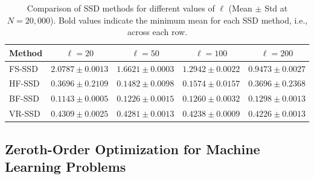 \documentclass[10pt]{article} %
\numberwithin{equation}{section}
\theoremstyle{plain}
\theoremstyle{definition}
\newcommand{\<}{\langle}
\renewcommand{\>}{\rangle}
\renewcommand{\(}{\left(}
\renewcommand{\)}{\right)}
\renewcommand{\[}{\left[}
\renewcommand{\]}{\right]}
\begin{document}

\begin{table}[ht!]
\centering
\caption{Comparison of SSD methods for different values of $\ell$ (Mean $\pm$ Std at $N=20,000$). Bold values indicate the minimum mean for each SSD method, i.e., across each row.}
\label{tab:worst-ell-performance}
\begin{tabular}{@{}lcccc@{}}
\toprule
Method & $\ell=20$ & $\ell=50$ & $\ell=100$ & $\ell=200$ \\ \midrule
FS-SSD & $2.0787 \pm 0.0013$ & $1.6621 \pm 0.0003$ & $1.2942 \pm 0.0022$ & $\mathbf{0.9473 \pm 0.0027}$ \\
HF-SSD & $0.3696 \pm 0.2109$ & $\mathbf{0.1482 \pm 0.0098}$ & $0.1574 \pm 0.0157$ & $0.3696 \pm 0.2368$ \\
BF-SSD & $\mathbf{0.1143 \pm 0.0005}$ & $0.1226 \pm 0.0015$ & $0.1260 \pm 0.0032$ & $0.1298 \pm 0.0013$ \\
VR-SSD & $0.4309 \pm 0.0025$ & $0.4281 \pm 0.0013$ & $0.4238 \pm 0.0009$ & $\mathbf{0.4226 \pm 0.0013}$ \\ \bottomrule
\end{tabular}
\end{table}


\subsection{Zeroth-Order Optimization for Machine Learning Problems}
\label{ssec:zo-for-ml}
\end{document}
